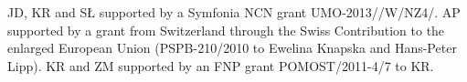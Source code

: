 JD, KR and SŁ supported by a Symfonia NCN grant UMO-2013//\allowbreak W/\allowbreak NZ4/. 
AP supported by a grant from Switzerland
through the Swiss Contribution to the enlarged European Union (PSPB-210/2010
to Ewelina Knapska and Hans-Peter Lipp).
KR and ZM supported by an FNP grant POMOST/2011-4/7 to KR.
